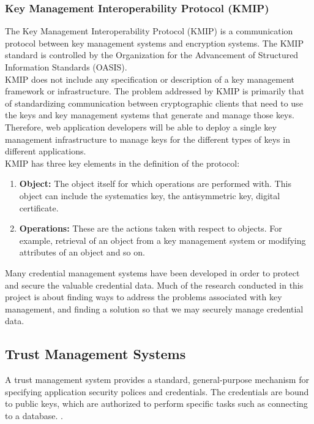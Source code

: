 \documentclass[11pt, a4paper, notitlepage]{article}
\begin{document}
\subsubsection*{Key Management Interoperability Protocol (KMIP)}
The Key Management Interoperability Protocol (KMIP) is a communication protocol between key management systems and encryption systems. The KMIP standard is controlled by the Organization for the Advancement of Structured Information Standards (OASIS). \\

KMIP does not include any specification or description of a key management framework or infrastructure. The problem addressed by KMIP is primarily that of standardizing communication between cryptographic clients that need to use the keys and key management systems that generate and manage those keys. Therefore, web application developers will be able to deploy a single key management infrastructure to manage keys for the different types of keys in different applications. \\

KMIP has three key elements in the definition of the protocol:
\begin{enumerate}
\item \textbf{Object:} The object itself for which operations are performed with. This object can include the systematics key, the antisymmetric key, digital certificate.
\item \textbf{Operations:} These are the actions taken with respect to objects. For example, retrieval of an object from a key management system or modifying attributes of an object and so on.
\end{enumerate}

Many credential management systems have been developed in order to protect and secure the valuable credential data. Much of the research conducted in this project is about finding ways to address the problems associated with key management, and finding a solution so that we may securely manage credential data. \\

\subsection*{Trust Management Systems}
A trust management system provides a standard, general-purpose mechanism for specifying application security polices and credentials. The credentials are bound to public keys, which are authorized to perform specific tasks such as connecting to a database. \cite{blaze1999keynote}. \\
\end{document}

